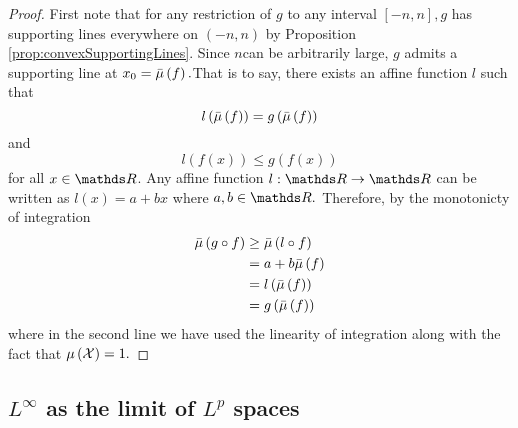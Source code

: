 \begin{proof}
First note that for any restriction of $g$ to any interval $\left[-n,n\right],$$g$
has supporting lines everywhere on $\left(-n,n\right)$ by Proposition
\ref{prop:convexSupportingLines}. Since $n$can be arbitrarily large,
$g$ admits a supporting line at $x_{0}=\bar{\mu}\left(f\right).$That is to
say, there exists an affine function $l$ such that 
\[
l\left(\bar{\mu}\left(f\right)\right)=g\left(\bar{\mu}\left(f\right)\right)
\]
and
\[
l\left(f\left(x\right)\right)\leq g\left(f\left(x\right)\right)
\]
for all $x\in\R$. Any affine function $l:\R\to\R$ can be written
as $l\left(x\right)=a+bx$ where $a,b\in\R.$ Therefore, by the monotonicty
of integration
\begin{align*}
\bar{\mu}\left(g\circ f\right) & \geq\bar{\mu}\left(l\circ f\right)\\
 & =a+b\bar{\mu}\left(f\right)\\
 & =l\left(\bar{\mu}\left(f\right)\right)\\
 & =g\left(\bar{\mu}\left(f\right)\right)
\end{align*}
where in the second line we have used the linearity of integration
along with the fact that $\mu\left(\mathcal{X}\right)=1.$
\end{proof}

\subsection{$L^{\infty}$ as the limit of $L^{p}$ spaces}

